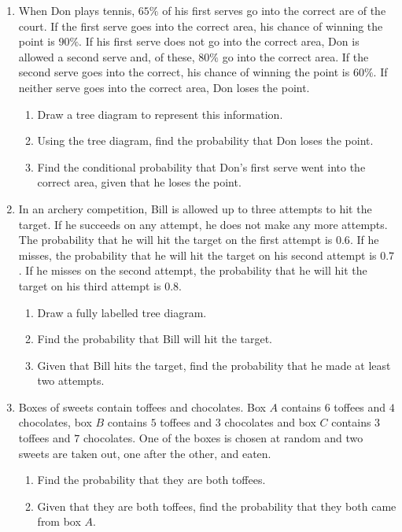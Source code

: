 \begin{enumerate}
	
	
	\item When Don plays tennis, $65\%$ of his first serves go into the correct are of the court. If the first serve goes into the correct area, his chance of winning the point is $90\%$. If his first serve does not go into the correct area, Don is allowed a second serve and, of these, $80\%$ go into the correct area. If the second serve goes into the correct, his chance of winning the point is $60\%$. If neither serve goes into the correct area, Don loses the point.
	\begin{enumerate}
		\item Draw a tree diagram to represent  this information.
		\item Using the tree diagram, find the probability that Don loses the point.
		\item Find the conditional probability that Don's first serve went into the correct area, given that he loses the point.
	\end{enumerate} 
	
	
	
	\item In an archery competition, Bill is allowed up to three attempts to hit the target. If he succeeds on any attempt, he does not make any more attempts. The probability that he will hit the target on the first attempt is $0.6$. If he misses, the probability that he will hit the target on his second attempt is $0.7$. If he misses on the second attempt, the probability that he will hit the target on his third attempt is $0.8$.
	
	\begin{enumerate}
		\item Draw a fully labelled tree diagram.
		\item Find the probability that Bill will hit the target.
		\item Given that Bill hits the target, find the probability that he made at least two attempts.
	\end{enumerate}


\item Boxes of sweets contain toffees and chocolates. Box $A$ contains $6$ toffees and $4$ chocolates, box $B$ contains $5$ toffees and $3$ chocolates and box $C$ contains $3$ toffees and $7$ chocolates. One of the boxes is chosen at random and two sweets are taken out, one after the other, and eaten.
\begin{enumerate}
	\item Find the probability that they are both toffees.
	\item Given that they are both toffees, find the probability that they both came from box $A$.
\end{enumerate}
	
	
\end{enumerate}	
	
